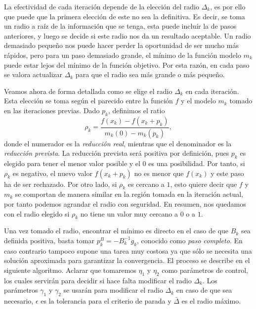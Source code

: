 \documentclass[11pt,a4paper]{book}
\theoremstyle{definition}
\theoremstyle{remark}
\begin{document}
La efectividad de cada iteración depende de la elección del radio $\Delta_k$, es por ello que
puede que la primera elección de este no sea la definitiva. Es decir, se toma un radio a raíz
de la información que se tenga, esta puede incluír la de pasos anteriores, y luego se decide si
este radio nos da un resultado aceptable. Un radio demasiado pequeño nos puede hacer perder la
oportunidad de ser mucho más rápidos, pero para un paso demasiado grande, el mínimo de la función
modelo $m_k$ puede estar lejos del mínimo de la función objetivo. Por esta razón, en cada paso
se valora actualizar $\Delta_k$ para que el radio sea más grande o más pequeño.

Veamos ahora de forma detallada como se elige el radio $\Delta_k$ en cada iteración. Esta elección
se toma según el parecido entre la función $f$ y el modelo $m_k$ tomado en las iteraciones previas.
Dado $p_k$, definimos el ratio
\begin{equation}
\label{eq:rho_k}
	\rho_k = \frac{f(x_k)-f(x_k+p_k)}{m_k(0)-m_k(p_k)},
\end{equation}
donde el numerador es la \textit{reducción real}, mientras que el denominador es la \textit{reducción prevista}.
La reducción prevista será positiva por definición, pues $p_k$ es elegido para tener el menor valor posible y el $0$ es una posibilidad.
Por tanto, si $\rho_k$ es negativo, el nuevo valor $f(x_k+p_k)$ no es menor que $f(x_k)$ y este paso ha de ser rechazado.
Por otro lado, si $\rho_k$ es cercano a $1$, esto quiere decir que $f$ y $m_k$ se comportan de manera similar en la región tomada en la iteración actual, por tanto podemos agrandar el radio con seguridad.
En resumen, nos quedamos con el radio elegido si $\rho_k$ no tiene un valor muy cercano a $0$ o a $1$.

Una vez tomado el radio, encontrar el mínimo es directo en el caso de que $B_k$ sea definida
positiva, basta tomar $p_k^B = -B_k^{-1}g_k$, conocido como \textit{paso completo}. En caso
contrario tampoco supone una tarea muy costosa ya que sólo se necesita una solución aproximada
para garantizar la convergencia. El proceso se describe en el siguiente algoritmo.
Aclarar que tomaremos $\eta_1$ y $\eta_2$ como parámetros de control,
los cuales servirán para decidir si hace falta modificar el radio $\Delta_k$. Los parámetros
$\gamma_1$ y $\gamma_2$ se usarán para modificar el radio $\Delta_k$ en caso de que sea necesario,
$\epsilon$ es la tolerancia para el criterio de parada y $\bar{\Delta}$ es el radio máximo.
\end{document}

